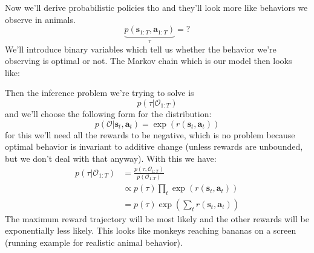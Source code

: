 \documentclass{report}
\begin{document}
Now we'll derive probabilistic policies tho and they'll look more like behaviors we observe in animals.
\begin{equation}
		\underbrace{p (\bm{s}_{1:T}, \bm{a}_{1:T})}_{ \tau } = ?
\end{equation}
We'll introduce binary variables which tell us whether the behavior we're observing is optimal or not.
The Markov chain which is our model then looks like:
\begin{figure}[htpb]
\begin{center}
\end{center}
\end{figure}

Then the inference problem we're trying to solve is
\begin{equation}
		p (\tau | \mathcal{O}_{ 1:T })
\end{equation}
and we'll choose the following form for the distribution:
\begin{equation}
		p (\mathcal{O}| \bm{s}_{t}, \bm{a}_{t}) = \exp (r (\bm{s}_{t}, \bm{a}_{t} ))
\end{equation}
for this we'll need all the rewards to be negative, which is no problem because optimal 
behavior is invariant to additive change (unless rewards are unbounded, but we don't deal with that anyway).
With this we have:
\begin{align}
p (\tau| \mathcal{O}_{ 1:T }) &= \frac{p (\tau, \mathcal{O}_{ 1:T })}{p (\mathcal{O}_{ 1:T })} \\
&\propto p (\tau) \prod_{t}^{} \exp (r(\bm{s}_{t}, \bm{a}_{t} ))\\ 
&= p (\tau) \exp \left( \sum_{t}^{} r (\bm{s}_{t}, \bm{a}_{t} ) \right)  
\end{align}
The maximum reward trajectory will be most likely and the other rewards will be exponentially less likely.
This looks like monkeys reaching bananas on a screen (running example for realistic animal behavior).
\end{document}
